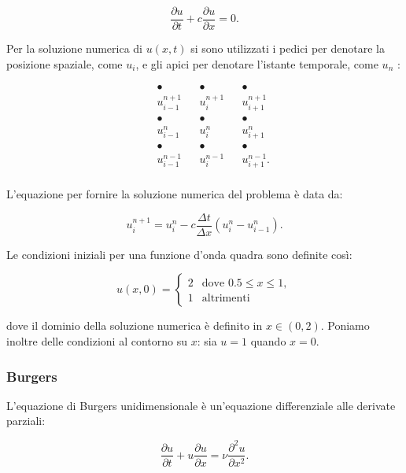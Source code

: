 \begin{equation}
\frac{\partial u}{\partial t} + c \frac{\partial u}{\partial x} = 0.
\end{equation}

\noindent
Per la soluzione numerica di $u(x,t)$ si sono utilizzati i pedici per denotare la posizione spaziale, come $u_i$, e gli apici per denotare l’istante temporale, come $u_n$ : 

$$
\begin{matrix}
& &\bullet & & \bullet & &  \bullet \\
& &u^{n+1}_{i-1} & & u^{n+1}_i & & u^{n+1}_{i+1} \\
& &\bullet & & \bullet & &  \bullet \\
& &u^n_{i-1} & & u^n_i & & u^n_{i+1} \\
& &\bullet & & \bullet & &  \bullet \\
& &u^{n-1}_{i-1} & & u^{n-1}_i & & u^{n-1}_{i+1}. \\
\end{matrix}
$$

\noindent
L’equazione per fornire la soluzione numerica del problema è data da:

\begin{equation}
u_i^{n+1} = u_i^n - c \frac{\Delta t}{\Delta x}(u_i^n-u_{i-1}^n).
\end{equation}

\noindent
Le condizioni iniziali per una funzione d’onda quadra sono definite così:

\begin{equation}
u(x,0)=\begin{cases}2 & \text{dove } 0.5\leq x \leq 1,\\
1 & \text{altrimenti} 
\end{cases}
\end{equation}

\noindent
dove il dominio della soluzione numerica è definito in $x\in(0,2)$.
Poniamo inoltre delle condizioni al contorno su $x$: sia $u = 1$ quando $x = 0$.

\subsubsection*{Burgers}
L’equazione di Burgers unidimensionale è un’equazione differenziale alle derivate parziali: 

\begin{equation}
\frac{\partial u}{\partial t} + u \frac{\partial u}{\partial x} = \nu \frac{\partial ^2u}{\partial x^2}.
\end{equation}

